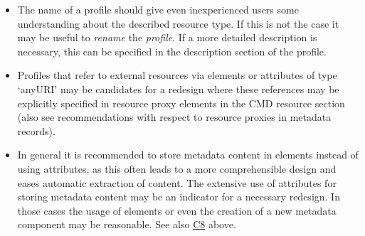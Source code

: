 \begin{itemize}
\item
  The name of a profile should give even inexperienced users some understanding about the described resource type. If this is not the case it may be useful to \emph{rename} the \emph{profile}. If a more detailed description is necessary, this can be specified in the description section of the profile.
\item
  Profiles that refer to external resources via elements or attributes of type `anyURI' may be candidates for a redesign where these references may be explicitly specified in resource proxy elements in the CMD resource section (also see recommendations with respect to resource proxies in metadata records).
\item
  In general it is recommended to store metadata content in elements instead of using attributes, as this often leads to a more comprehensible design and eases automatic extraction of content. The extensive use of attributes for storing metadata content may be an indicator for a necessary redesign. In those cases the usage of elements or even the creation of a new metadata component may be reasonable. See also \hyperref[c8]{C8} above.
\end{itemize}
